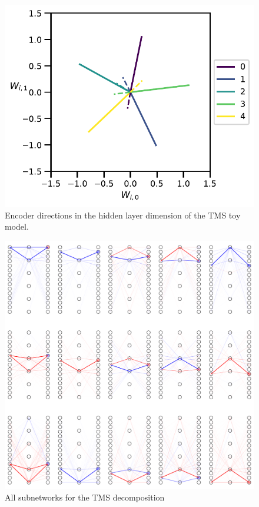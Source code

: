\documentclass{article}
\theoremstyle{plain}
\theoremstyle{definition}
\theoremstyle{remark}
\begin{document}
\begin{figure}[ht]
    \centerline{\includegraphics{../figures/s2_tms_encoder_directions.pdf}}
    \centering
    \caption{Encoder directions in the hidden layer dimension of the TMS toy model.}\label{fig:s2_tms_encoder_directions}
\end{figure}


\begin{figure}[ht]
    \centerline{\includegraphics[width=\textwidth]{../figures/s3_tms_full_subnetworks.pdf}}
    \centering
    \caption{All subnetworks for the TMS decomposition}\label{fig:s3_tms_full_subnetworks}
\end{figure}
\end{document}
